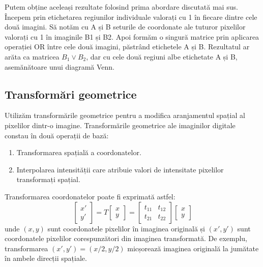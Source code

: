 Putem obține aceleași rezultate folosind prima abordare discutată mai sus. Începem prin etichetarea regiunilor individuale valorați cu 1 în fiecare dintre cele două imagini. Să notăm cu A și B seturile de coordonate ale tuturor pixelilor valorați cu 1 în imaginile B1 și B2. Apoi formăm o singură matrice prin aplicarea operației OR între cele două imagini, păstrând etichetele A și B. Rezultatul ar arăta ca matricea $B_1 \vee B_2$, dar cu cele două regiuni albe etichetate A și B, asemănătoare unui diagramă Venn.

\subsection*{Transformări geometrice}

Utilizăm transformările geometrice pentru a modifica aranjamentul spațial al pixelilor dintr-o imagine. Transformările geometrice ale imaginilor digitale constau în două operații de bază:
\begin{enumerate}
    \item Transformarea spațială a coordonatelor.
    \item Interpolarea intensității care atribuie valori de intensitate pixelilor transformați spațial.
\end{enumerate}

Transformarea coordonatelor poate fi exprimată astfel:
\[
    \begin{bmatrix}
        x' \\
        y'
    \end{bmatrix}
    =
    T
    \begin{bmatrix}
        x \\
        y
    \end{bmatrix}
    =
    \begin{bmatrix}
        t_{11} & t_{12} \\
        t_{21} & t_{22}
    \end{bmatrix}
    \begin{bmatrix}
        x \\
        y
    \end{bmatrix}
\]
unde $(x, y)$ sunt coordonatele pixelilor în imaginea originală și $(x', y')$ sunt coordonatele pixelilor corespunzători din imaginea transformată. De exemplu, transformarea $(x', y') = (x/2, y/2)$ micșorează imaginea originală la jumătate în ambele direcții spațiale.

